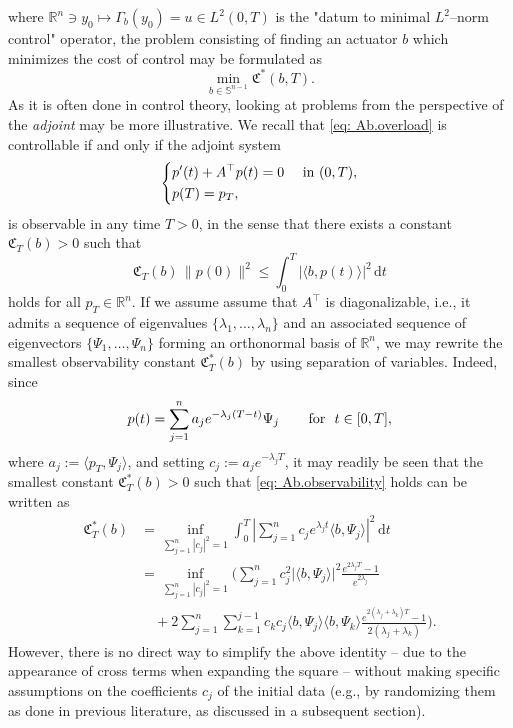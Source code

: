 \documentclass[journal,twoside,web]{ieeecolor}
\newcommand{\diff}{\, \mathrm{d}}
\newcommand{\R}{\mathbb{R}}
\begin{document}
	where $\R^n\ni y_0\mapsto\Gamma_b(y_0) = u\in L^2(0,T)$ is the "datum to minimal $L^2$--norm control" operator, the problem consisting of finding an actuator $b$ which minimizes the cost of control may be formulated as 
	\begin{equation} \label{eq: inf.control.cost.b}
	\boxed{
	\min_{b\in\mathbb{S}^{n-1}} \mathfrak{C}^*(b,T).
	}
	\end{equation}	
	As it is often done in control theory, looking at problems from the perspective of the \emph{adjoint} may be more illustrative. 
	We recall that \eqref{eq: Ab.overload} is controllable if and only if the adjoint system 
	\begin{equation}
	\begin{dcases}
	p'(t) + A^\top p(t) = 0 &\text{ in } (0,T),\\
	p(T) = p_T,
	\end{dcases}
	\end{equation}
	is observable in any time $T>0$, in the sense that there exists a constant $\mathfrak{C}_T(b)>0$ such that
	\begin{equation} \label{eq: Ab.observability}
	\mathfrak{C}_T(b)\, \|p(0)\|^2 \leqslant \int_0^T \big|\langle b, p(t)\rangle\big|^2 \diff t
	\end{equation}
	holds for all $p_T\in\R^n$. 
	If we assume assume that $A^\top$ is diagonalizable, i.e., it admits a sequence of eigenvalues $\{\lambda_1,\ldots,\lambda_n\}$ and an associated sequence of eigenvectors $\{\Psi_1,\ldots,\Psi_n\}$ forming an orthonormal basis of $\R^n$, we may rewrite the smallest observability constant $\mathfrak{C}_T^*(b)$ by using separation of variables. 
	Indeed, since 
	\begin{equation*}
	p(t) = \sum_{j=1}^n a_j e^{-\lambda_j(T-t)}\Psi_j \hspace{0.5cm} \text{ for } t\in[0,T],
	\end{equation*}
	where $a_j:=\langle p_T, \Psi_j\rangle$, and setting $c_j := a_j e^{-\lambda_j T}$, it may readily be seen that the smallest constant $\mathfrak{C}^*_T(b)>0$ such that \eqref{eq: Ab.observability} holds can be written as
	\begin{align*}
	\mathfrak{C}^*_T(b) &= \inf_{\sum_{j=1}^{n}|c_j|^2=1} \int_0^T \left| \sum_{j=1}^n c_j e^{\lambda_j t}\langle b,\Psi_j\rangle \right|^2 \diff t \\
	&= \inf_{\sum_{j=1}^{n}|c_j|^2=1}\Bigg(\sum_{j=1}^n c_j^2 \big|\langle b,\Psi_j\rangle\big|^2 \frac{e^{2\lambda_j T}-1}{e^{2\lambda_j}} \\
	&\quad+ 2 \sum_{j=1}^n \sum_{k=1}^{j-1} c_k c_j  \langle b,\Psi_j\rangle \langle b,\Psi_k\rangle \frac{e^{2(\lambda_j+\lambda_k)T}-1}{2(\lambda_j+\lambda_k)}\Bigg). 
	\end{align*}
	However, there is no direct way to simplify the above identity -- due to the appearance of cross terms when expanding the square -- without making specific assumptions on the coefficients $c_j$ of the initial data (e.g., by randomizing them as done in previous literature, as discussed in a subsequent section).  
		
\end{document}
